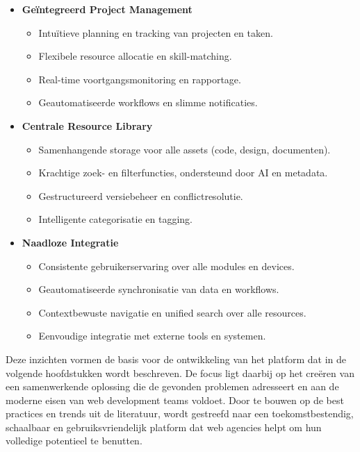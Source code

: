 \begin{itemize}
    \item \textbf{Geïntegreerd Project Management}
    \begin{itemize}
        \item Intuïtieve planning en tracking van projecten en taken.
        \item Flexibele resource allocatie en skill-matching.
        \item Real-time voortgangsmonitoring en rapportage.
        \item Geautomatiseerde workflows en slimme notificaties.
    \end{itemize}
    
    \item \textbf{Centrale Resource Library}
    \begin{itemize}
        \item Samenhangende storage voor alle assets (code, design, documenten).
        \item Krachtige zoek- en filterfuncties, ondersteund door AI en metadata.
        \item Gestructureerd versiebeheer en conflictresolutie.
        \item Intelligente categorisatie en tagging.
    \end{itemize}
    
    \item \textbf{Naadloze Integratie}
    \begin{itemize}
        \item Consistente gebruikerservaring over alle modules en devices.
        \item Geautomatiseerde synchronisatie van data en workflows.
        \item Contextbewuste navigatie en unified search over alle resources.
        \item Eenvoudige integratie met externe tools en systemen.
    \end{itemize}
\end{itemize}

Deze inzichten vormen de basis voor de ontwikkeling van het platform dat in de volgende hoofdstukken wordt beschreven. De focus ligt daarbij op het creëren van een samenwerkende oplossing die de gevonden problemen adresseert en aan de moderne eisen van web development teams voldoet. Door te bouwen op de best practices en trends uit de literatuur, wordt gestreefd naar een toekomstbestendig, schaalbaar en gebruiksvriendelijk platform dat web agencies helpt om hun volledige potentieel te benutten.

